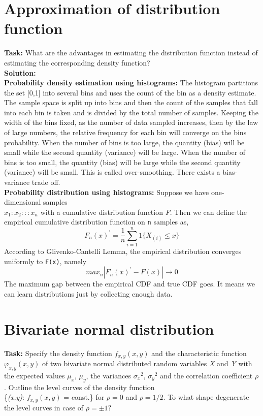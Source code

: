  
 
\section{Approximation of distribution function}
\noindent \textbf{Task:} What are the advantages in estimating the distribution function instead of estimating the corresponding density function? \\
\noindent \textbf{Solution:} \\
\noindent \textbf{Probability density estimation using histograms:} The histogram partitions the set [0,1] into several bins and uses the count of the bin as a density estimate. The sample space is split up into bins and then the count of the samples that fall into each bin is taken and is divided by the total number of samples. Keeping the width of the bins fixed, as the number of data sampled increases, then by the law of large numbers, the relative frequency for each bin will converge on the bins probability. When the number of bins is too large, the quantity (bias) will be small while the second quantity (variance) will be large. When the number of bins is too small, the quantity (bias) will be large while the second quantity (variance) will be small. This is called over-smoothing. There exists a bias-variance trade off.\\
\noindent \textbf{Probability distribution using histograms:} Suppose we have one-dimensional samples \\\texttt{$x_1:x_2:::x_n$} with a cumulative distribution function \textit{F}. Then we can define the empirical cumulative distribution function on \texttt{n} samples as,
$$ {F_n(x)}^{'} = \frac{1}{n}\sum_{i=1}^{n} 1\{ X_{(i)}\leq x \} $$
\noindent According to Glivenko-Cantelli Lemma, the empirical distribution converges uniformly to \texttt{F(x)}, namely
$$ {max}_{n}|{F_n(x)}^{'} - F(x)| \longrightarrow 0 $$
\noindent The maximum gap between the empirical CDF and true CDF goes. It means we can learn distributions just by collecting enough data.

\section{Bivariate normal distribution}
\noindent \textbf{Task:} Specify the density function $f_{x,y}(x,y)$ and the characteristic function $\varphi_{x,y}(x,y)$ of two bivariate normal distributed random variables \textit{X} and \textit{Y} with the expected values $\mu_x$, $\mu_y$, the variances ${\sigma_x}^2$, ${\sigma_y}^2$  and the correlation coefficient $\rho$. Outline the level curves of the density function\\
 \{\textit{(x,y)}: $f_{x,y}(x,y)$ = const.\} for $\rho = 0$ and $\rho = 1/2.$ To what shape degenerate the level curves in
case of $\rho = \pm 1?$

